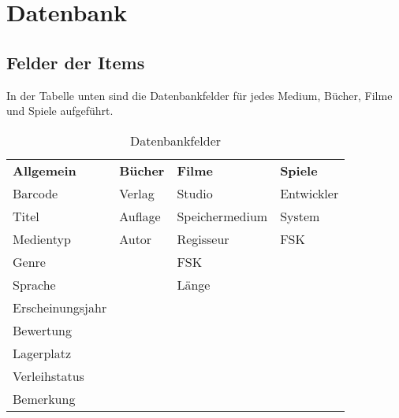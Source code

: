 \section{Datenbank}

\subsection{Felder der Items}
\label{sec:Felder}

In der Tabelle unten sind die Datenbankfelder für jedes Medium, Bücher, Filme und Spiele aufgeführt.

\begin{table} [h]
	\begin{center}
		\begin{tabular}{|l|l|l|l|}
			\rowcolor{black} {\color{white}\textbf{Allgemein}} & {\color{white}\textbf{Bücher}} & {\color{white}\textbf{Filme}} & {\color{white}\textbf{Spiele}} \\
			Barcode & Verlag & Studio & Entwickler\\ \hline
			\rowcolor{DarkSeaGreen} Titel & Auflage & Speichermedium & System \\ \hline			Medientyp & Autor& Regisseur & FSK \\ \hline
			\rowcolor{DarkSeaGreen} Genre & & FSK & \\ \hline
			Sprache & & Länge & \\ \hline
			\rowcolor{DarkSeaGreen} Erscheinungsjahr & & & \\ \hline
			Bewertung & & & \\ \hline
			\rowcolor{DarkSeaGreen} Lagerplatz & & & \\ \hline
			Verleihstatus & & & \\ \hline
			\rowcolor{DarkSeaGreen} Bemerkung & & & \\ \hline		
		\end{tabular}
	\caption{Datenbankfelder}
	\label{tab:Datenbankfelder}
	\end{center}
\end{table}